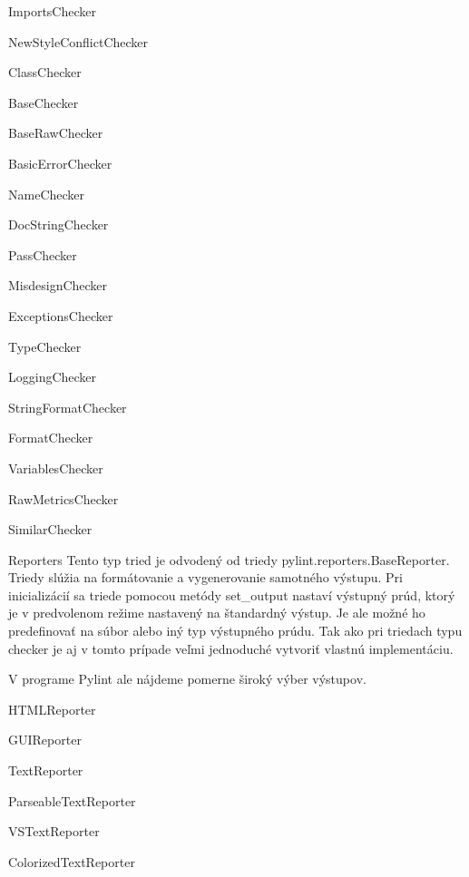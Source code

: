 \documentclass[11pt,oneside,final]{fithesis2}
\begin{document}
\begin{list}{•}{}
			    \begin{list}{•}{}
					\item ImportsChecker
					\item NewStyleConflictChecker
					\item ClassChecker
					\item BaseChecker
					\item BaseRawChecker
					\item BasicErrorChecker
					\item NameChecker
					\item DocStringChecker
					\item PassChecker
					\item MisdesignChecker
					\item ExceptionsChecker
					\item TypeChecker
					\item LoggingChecker
					\item StringFormatChecker
					\item FormatChecker
					\item VariablesChecker
					\item RawMetricsChecker
					\item SimilarChecker
    			\end{list}
		

		
		\item Reporters
		Tento typ tried je odvodený od triedy pylint.reporters.BaseReporter. Triedy slúžia na formátovanie a vygenerovanie samotného výstupu. Pri inicializácií sa triede pomocou metódy set\_output nastaví výstupný prúd, ktorý je v predvolenom režime nastavený na štandardný výstup. Je ale možné ho predefinovať na súbor alebo iný typ výstupného prúdu. Tak ako pri triedach typu checker je aj v tomto prípade veľmi jednoduché vytvoriť vlastnú implementáciu.
		
		V programe Pylint ale nájdeme pomerne široký výber výstupov.
		
			    \begin{list}{•}{}
					\item HTMLReporter
					\item GUIReporter
					\item TextReporter
					\item ParseableTextReporter
					\item VSTextReporter
					\item ColorizedTextReporter
    			\end{list}
		
    \end{list}
		
\end{document}
